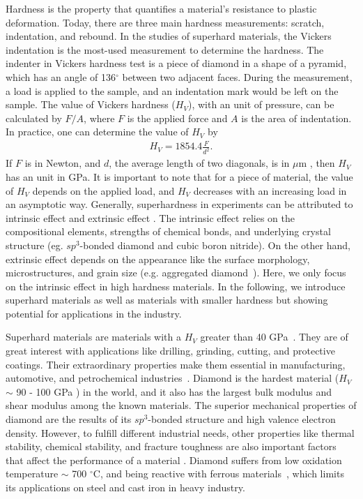 Hardness is the property that quantifies a material's resistance to plastic deformation. Today, there are three main hardness measurements: scratch, indentation, and rebound. In the studies of superhard materials, the Vickers indentation is the most-used measurement to determine the hardness. The indenter in Vickers hardness test is a piece of diamond in a shape of a pyramid, which has an angle of 136$^\circ$ between two adjacent faces. During the measurement, a load is applied to the sample, and an indentation mark would be left on the sample. The value of Vickers hardness ($H_V$), with an unit of pressure, can be calculated by $F/A$, where $F$ is the applied force and $A$ is the area of indentation. In practice, one can determine the value of $H_V$ by
	\begin{equation}
		\begin{aligned}
		\label{eq}
			H_V = 1854.4\frac{F}{d^2}.
		\end{aligned}
	\end{equation}
If $F$ is in Newton, and $d$, the average length of two diagonals, is in $\mu$m , then $H_V$ has an unit in GPa. It is important to note that for a piece of material, the value of $H_V$ depends on the applied load, and $H_V$ decreases with an increasing load in an asymptotic way. Generally, superhardness in experiments can be attributed to intrinsic effect and extrinsic effect \cite{vepvrek1999search}. The intrinsic effect relies on the compositional elements, strengths of chemical bonds, and underlying crystal structure (eg. $sp^3$-bonded diamond and cubic boron nitride). On the other hand, extrinsic effect depends on the appearance like the surface morphology, microstructures, and grain size (e.g. aggregated diamond~\cite{dubrovinskaia2005aggregated}). Here, we only focus on the intrinsic effect in high hardness materials. In the following, we introduce superhard materials as well as materials with smaller hardness but showing potential for applications in the industry.

Superhard materials are materials with a $H_V$ greater than 40 GPa~\cite{kaner2005designing}. They are of great interest with applications like drilling, grinding, cutting, and protective coatings. Their extraordinary properties make them essential in manufacturing, automotive, and petrochemical industries~\cite{zhao2016recent}. Diamond is the hardest material ($H_V$ $\sim$ 90 - 100 GPa \cite{xu2015ultrahardness}) in the world, and it also has the largest bulk modulus and shear modulus among the known materials. The superior mechanical properties of diamond are the results of its $sp^3$-bonded structure and high valence electron density. However, to fulfill different industrial needs, other properties like thermal stability, chemical stability, and fracture toughness are also important factors that affect the performance of a material \cite{monteiro2013cubic}. Diamond suffers from low oxidation temperature $\sim$ 700 $^{\circ}$C, and being reactive with ferrous materials~\cite{haines2001synthesis}, which limits its applications on steel and cast iron in heavy industry. 
    

